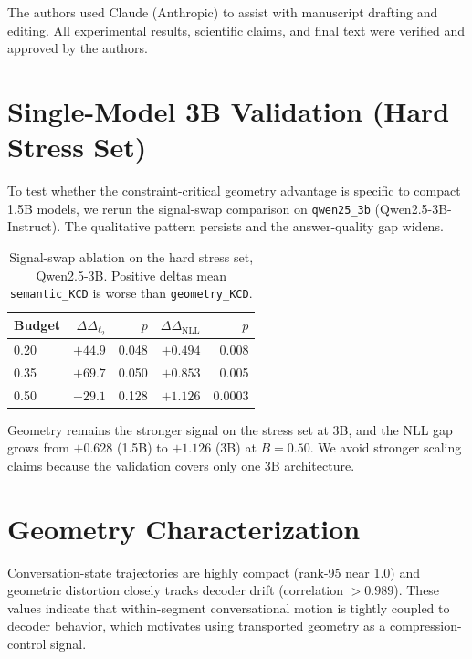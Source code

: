 \documentclass[11pt]{article}
\newcommand{\Logit}{\Delta_{\ell_2}}
\newcommand{\NLL}{\Delta_{\mathrm{NLL}}}
\newcommand{\pname}[1]{\texttt{\small #1}}
\begin{document}
The authors used Claude (Anthropic) to assist with manuscript drafting and editing. All experimental results, scientific claims, and final text were verified and approved by the authors.



\appendix
\section{Single-Model 3B Validation (Hard Stress Set)}
\label{app:3b}
To test whether the constraint-critical geometry advantage is specific to compact 1.5B models, we rerun the signal-swap comparison on \pname{qwen25\_3b} (Qwen2.5-3B-Instruct). The qualitative pattern persists and the answer-quality gap widens.

\begin{table}[h]
\centering
\caption{Signal-swap ablation on the hard stress set, Qwen2.5-3B. Positive deltas mean \pname{semantic\_KCD} is worse than \pname{geometry\_KCD}.}
\label{tab:3b}
\begin{tabular}{lrrrr}
\toprule
Budget & $\Delta\Logit$ & $p$ & $\Delta\NLL$ & $p$ \\
\midrule
0.20 & $+44.9$ & 0.048 & $+0.494$ & 0.008 \\
0.35 & $+69.7$ & 0.050 & $+0.853$ & 0.005 \\
0.50 & $-29.1$ & 0.128 & $+1.126$ & 0.0003 \\
\bottomrule
\end{tabular}
\end{table}

Geometry remains the stronger signal on the stress set at 3B, and the NLL gap grows from $+0.628$ (1.5B) to $+1.126$ (3B) at $B{=}0.50$. We avoid stronger scaling claims because the validation covers only one 3B architecture.

\section{Geometry Characterization}
\label{app:geometry}
Conversation-state trajectories are highly compact (rank-95 near 1.0) and geometric distortion closely tracks decoder drift (correlation $>0.989$). These values indicate that within-segment conversational motion is tightly coupled to decoder behavior, which motivates using transported geometry as a compression-control signal.
\end{document}
